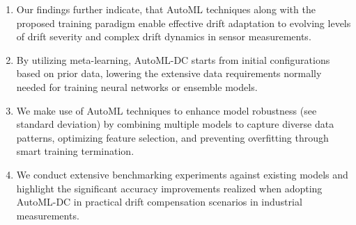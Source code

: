 \documentclass[preprint,12pt]{elsarticle}
\begin{document}
\begin{frontmatter}
\begin{highlights}
\begin{enumerate}
    \item Our findings further indicate, that AutoML techniques along with the proposed training paradigm enable effective drift adaptation to evolving levels of drift severity and complex drift dynamics in sensor measurements.
    \item By utilizing meta-learning, AutoML-DC starts from initial configurations based on prior data, lowering the extensive data requirements normally needed for training neural networks or ensemble models.
    \item We make use of AutoML techniques to enhance model robustness (see standard deviation) by combining multiple models to capture diverse data patterns, optimizing feature selection, and preventing overfitting through smart training termination.
    \item We conduct extensive benchmarking experiments against existing models and highlight the significant accuracy improvements realized when adopting AutoML-DC in practical drift compensation scenarios in industrial measurements.
\end{enumerate}
\end{highlights}

\end{frontmatter}
\end{document}

